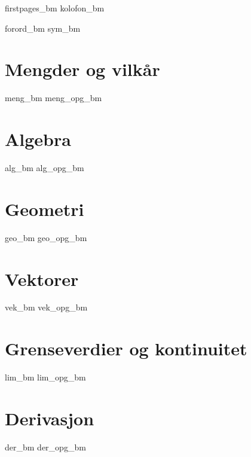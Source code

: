 




\addto\captionsenglish{\renewcommand{\figurename}{Figur}}
\makeatletter
\addto\captionsenglish{\renewcommand{\chaptername}{Kapittel}}
\addto\captionsenglish{\renewcommand{\contentsname}{Innhold}}


	
	{firstpages_bm}
	{kolofon_bm}
	\newpage
	
	{\small \tableofcontents}
	\newpage
	\phantom{text}
	\newpage
	{forord_bm}
	{sym_bm}
	
	\chapter{Mengder og vilkår} \label{Meng}
	\newpage
	{meng_bm}
	{meng_opg_bm}
	
	\chapter{Algebra} \label{Alg}
	\newpage
	{alg_bm} 
	{alg_opg_bm}
	
	\chapter{Geometri} \label{Geo}
	\newpage
	{geo_bm}
	{geo_opg_bm}	
	
	\chapter{Vektorer} \label{Vek}
	\newpage
	{vek_bm}
	{vek_opg_bm}	
		
	\chapter{Grenseverdier og kontinuitet} \label{Lim}
	\newpage
	{lim_bm}	
	{lim_opg_bm}
	
	\chapter{Derivasjon} \label{Derivasjon} \label{Der}
	\newpage
	{der_bm}
	{der_opg_bm}	
	
